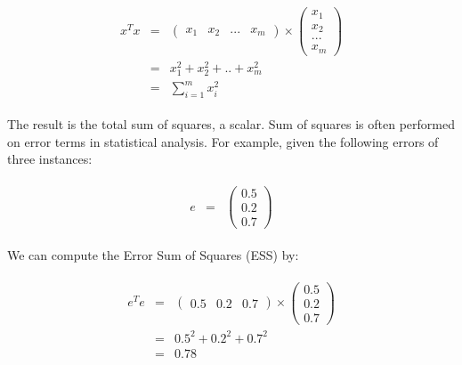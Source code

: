 \documentclass[
  letterpaper,
]{scrbook}
\begin{document}
\[\begin{aligned}
  \begin{matrix}
    x^Tx & = &
      \begin{pmatrix}
        x_1 &
        x_2 &
        ... &
        x_m
      \end{pmatrix}
      \times
      \begin{pmatrix}
        x_1 \\
        x_2 \\
        ... \\
        x_m
      \end{pmatrix} \\
      & = & x_1^2 + x_2^2 + .. + x_m^2 \\
      & = & \sum_{i=1}^{m} x_i^2
    \end{matrix}
\end{aligned}\]

The result is the total sum of squares, a scalar. Sum of squares is
often performed on error terms in statistical analysis. For example,
given the following errors of three instances:

\[\begin{aligned}
  \begin{matrix}
    e & = &
    \begin{pmatrix}
      0.5 \\
      0.2 \\
      0.7
    \end{pmatrix}
  \end{matrix}
\end{aligned}\]

We can compute the Error Sum of Squares (ESS) by:

\[\begin{aligned}
  \begin{matrix}
    e^Te & = &
      \begin{pmatrix}
        0.5 &
        0.2 &
        0.7
      \end{pmatrix}
      \times
      \begin{pmatrix}
        0.5 \\
        0.2 \\
        0.7
      \end{pmatrix} \\
      & = & 0.5^2 + 0.2^2 + 0.7^2 \\
      & = & 0.78
    \end{matrix}
\end{aligned}\]
\end{document}

